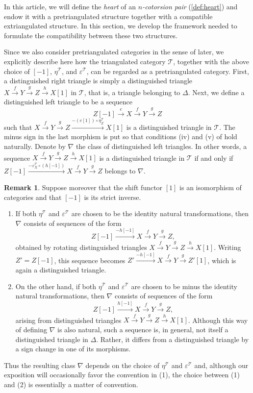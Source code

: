 \documentclass[a4paper,reqno,10pt]{amsart}
\theoremstyle{definition}
\theoremstyle{definition}
\newtheorem{remark}[remark]{Remark}
\theoremstyle{definition}
\theoremstyle{definition}
\theoremstyle{plain}
\newcommand{\CT}{\mathcal{T}}
\begin{document}
In this article, 
\normalcolor
we will define the \emph{heart} of an \emph{$n$-cotorsion pair} (\cref{def:heart}) and endow it with a pretriangulated structure together with a compatible extriangulated structure. \color{blue}
In this section, 
\normalcolor
we develop the framework needed to formulate the compatibility between these two structures.

\color{blue}
Since we also consider 
\normalcolor
pretriangulated categories in the sense of \cite{BR07} later, we explicitly describe here how the triangulated category $\CT$, together with the above choice of $[-1]$, $\eta^{\CT}$, and $\varepsilon^{\CT}$, can be regarded as a pretriangulated category.
First, a distinguished right triangle is simply a distinguished triangle
$X\xrightarrow{f}Y\xrightarrow{g}Z\xrightarrow{h}X[1]$ in $\CT$, that is, a triangle belonging to $\Delta$.
Next, we define a distinguished left triangle to be a sequence
\[
Z[-1]\xrightarrow{e}X\xrightarrow{f}Y\xrightarrow{g}Z
\]
such that
$X\xrightarrow{f}Y\xrightarrow{g}Z
\xrightarrow{-(e[1])\circ\eta^{\CT}_Z}
X[1]$
is a distinguished triangle in $\CT$.
The minus sign in the last morphism is put so that conditions {\rm (iv)} and {\rm (v)} of \cite[Definition~1.1]{BR07} hold naturally. 
Denote by $\nabla$ the class of distinguished left triangles. 
In other words, a sequence 
$X\xrightarrow{f}Y\xrightarrow{g}Z\xrightarrow{h}X[1]$
is a distinguished triangle in $\CT$ if and only if
$Z[-1]\xrightarrow{-\varepsilon^{\CT}_X\circ(h[-1])}
X\xrightarrow{f}Y\xrightarrow{g}Z$
belongs to $\nabla$.

\begin{remark}
Suppose moreover that the shift functor $[1]$ is an isomorphism of categories and that $[-1]$ is its strict inverse.
\begin{enumerate}
\item
If both $\eta^{\CT}$ and $\varepsilon^{\CT}$ are chosen to be the identity natural transformations, then $\nabla$ consists of sequences of the form
\[
Z[-1]\xrightarrow{-h[-1]}X\xrightarrow{f}Y\xrightarrow{g}Z,
\]
obtained by rotating distinguished triangles $X\xrightarrow{f}Y\xrightarrow{g}Z\xrightarrow{h}X[1]$.
Writing $Z'=Z[-1]$, this sequence becomes
$Z'\xrightarrow{-h[-1]}X\xrightarrow{f}Y\xrightarrow{g}Z'[1]$,
which is again a distinguished triangle.
\item
On the other hand, if both $\eta^{\CT}$ and $\varepsilon^{\CT}$ are chosen to be minus the identity natural transformations, then $\nabla$ consists of sequences of the form
\[
Z[-1]\xrightarrow{h[-1]}X\xrightarrow{f}Y\xrightarrow{g}Z,
\]
arising from distinguished triangles
$X\xrightarrow{f}Y\xrightarrow{g}Z\xrightarrow{h}X[1]$.
Although this way of defining $\nabla$ is also natural, such a sequence is, in general, not itself a distinguished triangle in $\Delta$. Rather, it differs from a distinguished triangle by a sign change in one of its morphisms.
\end{enumerate}
Thus the resulting class $\nabla$ depends on the choice of $\eta^{\CT}$ and $\varepsilon^{\CT}$ and, although our exposition will occasionally favor the convention in {\rm (1)}, the choice between {\rm (1)} and {\rm (2)} is essentially a matter of convention.
\end{remark}
\end{document}
